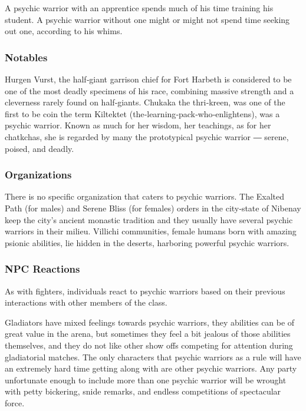A psychic warrior with an apprentice spends much of his time training his student. A psychic warrior without one might or might not spend time seeking out one, according to his whims.

\subsubsection{Notables}

Hurgen Vurst, the half‐giant garrison chief for Fort Harbeth is considered to be one of the most deadly specimens of his race, combining massive strength and a cleverness rarely found on half‐giants. Chukaka the thri‐kreen, was one of the first to be coin the term Kiltektet (the‐learning‐pack‐who‐enlightens), was a psychic warrior. Known as much for her wisdom, her teachings, as for her chatkchas, she is regarded by many the prototypical psychic warrior ― serene, poised, and deadly.

\subsubsection{Organizations}

There is no specific organization that caters to psychic warriors. The Exalted Path (for males) and Serene Bliss (for females) orders in the city‐state of Nibenay keep the city’s ancient monastic tradition and they usually have several psychic warriors in their milieu. Villichi communities, female humans born with amazing psionic abilities, lie hidden in the deserts, harboring powerful psychic warriors.

\subsubsection{NPC Reactions}

As with fighters, individuals react to psychic warriors based on their previous interactions with other members of the class.

Gladiators have mixed feelings towards psychic warriors, they abilities can be of great value in the arena, but sometimes they feel a bit jealous of those abilities themselves, and they do not like other show offs competing for attention during gladiatorial matches. The only characters that psychic warriors as a rule will have an extremely hard time getting along with are other psychic warriors. Any party unfortunate enough to include more than one psychic warrior will be wrought with petty bickering, snide remarks, and endless competitions of spectacular force.


